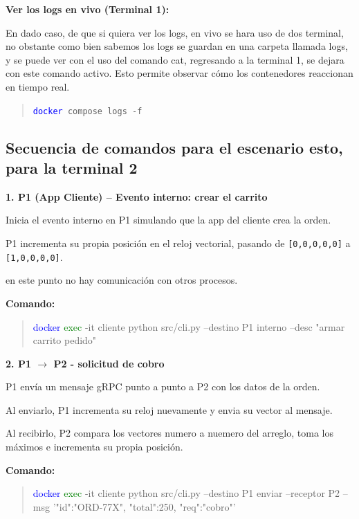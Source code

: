 \documentclass[letterpaper,11pt]{article}
\begin{document}
\textbf{Ver los logs en vivo (Terminal 1):}

En dado caso, de que si quiera ver los logs, en vivo se hara uso de dos terminal, no obstante
como bien sabemos los logs se guardan en una carpeta llamada logs, y se puede ver con el uso del comando cat, 
regresando a la terminal 1, se dejara con este comando activo. 
Esto permite observar cómo los contenedores reaccionan en tiempo real.

\begin{quote}
\texttt{\textcolor{blue}{docker} compose logs -f}
\end{quote}


\subsection{Secuencia de comandos para el escenario esto, para la terminal 2}

\begingroup
{}

\textbf{1. P1 (App Cliente) -- Evento interno: crear el carrito}

Inicia el evento interno en P1 simulando que la app del cliente crea la orden. 

P1 incrementa su propia posición en el reloj vectorial, pasando de \texttt{[0,0,0,0,0]} a \texttt{[1,0,0,0,0]}. 

en este punto no hay comunicación con otros procesos.

\begin{center}
  \textbf{Comando:}
\end{center}

\begin{quote}
\textcolor{blue}{docker} \textcolor{green}{exec} -it cliente python src/cli.py --destino P1 interno --desc "armar carrito pedido"
\end{quote}


\textbf{2. P1 $\rightarrow$ P2 - solicitud de cobro}

P1 envía un mensaje gRPC punto a punto a P2 con los datos de la orden. 

Al enviarlo, P1 incrementa su reloj nuevamente y envia su vector al mensaje. 

Al recibirlo, P2 compara los vectores numero a nuemero del arreglo, 
toma los máximos e incrementa su propia posición.

\begin{center}
  \textbf{Comando:}
\end{center}

\begin{quote}
\textcolor{blue}{docker} \textcolor{green}{exec} -it cliente python src/cli.py --destino P1 enviar --receptor P2 --msg '{"id":"ORD-77X", "total":250, "req":"cobro"}'
\end{quote}
\end{document}
